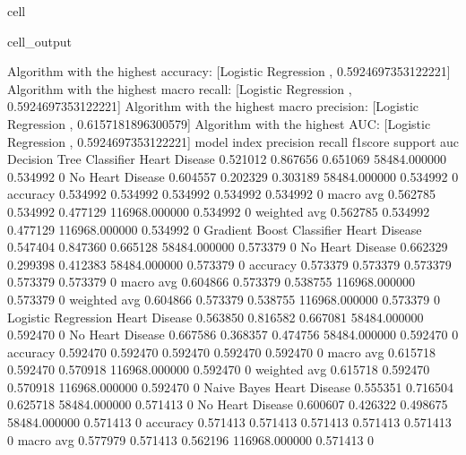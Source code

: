 \documentclass[letterpaper,10pt,english]{jupyterBook}
\begin{document}
\begin{sphinxuseclass}{cell}
\begin{sphinxVerbatimOutput}
\begin{sphinxuseclass}{cell_output}
\begin{sphinxVerbatim}[commandchars=\\\{\}]
Algorithm with the highest accuracy: [\PYGZsq{}Logistic Regression \PYGZsq{}, 0.5924697353122221]
Algorithm with the highest macro recall:
        [\PYGZsq{}Logistic Regression \PYGZsq{}, 0.5924697353122221]
Algorithm with the highest macro precision:
        [\PYGZsq{}Logistic Regression \PYGZsq{}, 0.6157181896300579]
Algorithm with the highest AUC:
        [\PYGZsq{}Logistic Regression \PYGZsq{}, 0.5924697353122221]
model                      index             precision  recall    f1\PYGZhy{}score  support        auc     
Decision Tree Classifier   Heart Disease     0.521012   0.867656  0.651069  58484.000000   0.534992    0
                           No Heart Disease  0.604557   0.202329  0.303189  58484.000000   0.534992    0
                           accuracy          0.534992   0.534992  0.534992  0.534992       0.534992    0
                           macro avg         0.562785   0.534992  0.477129  116968.000000  0.534992    0
                           weighted avg      0.562785   0.534992  0.477129  116968.000000  0.534992    0
Gradient Boost Classifier  Heart Disease     0.547404   0.847360  0.665128  58484.000000   0.573379    0
                           No Heart Disease  0.662329   0.299398  0.412383  58484.000000   0.573379    0
                           accuracy          0.573379   0.573379  0.573379  0.573379       0.573379    0
                           macro avg         0.604866   0.573379  0.538755  116968.000000  0.573379    0
                           weighted avg      0.604866   0.573379  0.538755  116968.000000  0.573379    0
Logistic Regression        Heart Disease     0.563850   0.816582  0.667081  58484.000000   0.592470    0
                           No Heart Disease  0.667586   0.368357  0.474756  58484.000000   0.592470    0
                           accuracy          0.592470   0.592470  0.592470  0.592470       0.592470    0
                           macro avg         0.615718   0.592470  0.570918  116968.000000  0.592470    0
                           weighted avg      0.615718   0.592470  0.570918  116968.000000  0.592470    0
Naive Bayes                Heart Disease     0.555351   0.716504  0.625718  58484.000000   0.571413    0
                           No Heart Disease  0.600607   0.426322  0.498675  58484.000000   0.571413    0
                           accuracy          0.571413   0.571413  0.571413  0.571413       0.571413    0
                           macro avg         0.577979   0.571413  0.562196  116968.000000  0.571413    0

\end{sphinxVerbatim}
\end{sphinxuseclass}
\end{sphinxVerbatimOutput}
\end{sphinxuseclass}
\end{document}
